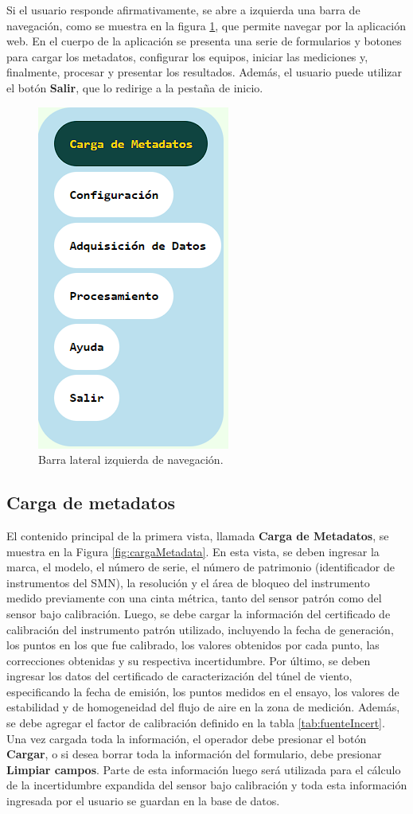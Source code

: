 Si el usuario responde afirmativamente, se abre a izquierda una barra de navegación, como se muestra en la figura \ref{fig:barraNavegIzq}, que permite navegar por la aplicación web. En el cuerpo de la aplicación se presenta una serie de formularios y botones para cargar los metadatos, configurar los equipos, iniciar las mediciones y, finalmente, procesar y presentar los resultados. Además, el usuario puede utilizar el botón \textbf{Salir}, que lo redirige a la pestaña de inicio.

\begin{figure}[H]
    \centering
    \includegraphics[width=0.2\linewidth]{Figuras/AplicacionWeb/frontend/barraNavegIzq.png}
    \caption{Barra lateral izquierda de navegación.}
    \label{fig:barraNavegIzq}
\end{figure}
\subsection{Carga de metadatos}\label{sec:cargaMetadatos}

El contenido principal de la primera vista, llamada \textbf{Carga de Metadatos}, se muestra en la Figura \ref{fig:cargaMetadata}. En esta vista, se deben ingresar la marca, el modelo, el número de serie, el número de patrimonio (identificador de instrumentos del SMN), la resolución y el área de bloqueo del instrumento medido previamente con una cinta métrica, tanto del sensor patrón como del sensor bajo calibración. Luego, se debe cargar la información del certificado de calibración del instrumento patrón utilizado, incluyendo la fecha de generación, los puntos en los que fue calibrado, los valores obtenidos por cada punto, las correcciones obtenidas y su respectiva incertidumbre. Por último, se deben ingresar los datos del certificado de caracterización del túnel de viento, especificando la fecha de emisión, los puntos medidos en el ensayo, los valores de estabilidad y de homogeneidad del flujo de aire en la zona de medición. Además, se debe agregar el factor de calibración definido en la tabla \ref{tab:fuenteIncert}. Una vez cargada toda la información, el operador debe presionar el botón \textbf{Cargar}, o si desea borrar toda la información del formulario, debe presionar \textbf{Limpiar campos}. Parte de esta información luego será utilizada para el cálculo de la incertidumbre expandida del sensor bajo calibración y toda esta información ingresada por el usuario se guardan en la base de datos.

